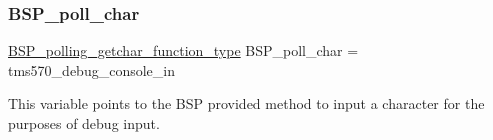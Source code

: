 \subsubsection{\texorpdfstring{BSP\_poll\_char}{BSP\_poll\_char}}
{\footnotesize\ttfamily \mbox{\hyperlink{bspIo_8h_a132b9ceff428a634ece5dfaac7ef1006}{B\+S\+P\+\_\+polling\+\_\+getchar\+\_\+function\+\_\+type}} B\+S\+P\+\_\+poll\+\_\+char = tms570\+\_\+debug\+\_\+console\+\_\+in}

This variable points to the B\+SP provided method to input a character for the purposes of debug input. 